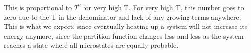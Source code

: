 \documentclass[10pt]{article} %
\begin{document}
This is proportional to $T^2$ for very high T. For very high T, this number goes to
zero due to the T in the denominator and lack of any growing terms anywhere. This is
what we expect, since eventually heating up a system will not increase its energy
anymore, since the partition function changes less and less as the system reaches a
state where all microstates are equally probable.\\
\end{document}
